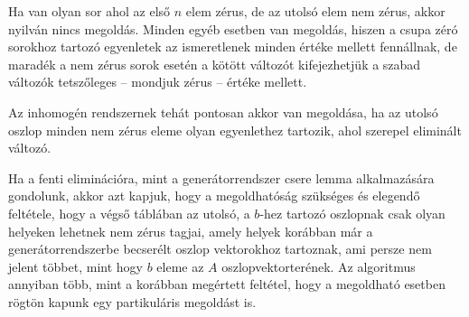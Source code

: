 \documentclass[9pt, showtrims]{memoir}
\theoremstyle{plain}
\theoremstyle{remark}
\theoremstyle{definition}
\begin{document}
Ha van olyan sor ahol az első $n$ elem zérus, de az utolsó elem nem zérus, 
akkor nyilván nincs megoldás.
Minden egyéb esetben van megoldás, 
hiszen a csupa zéró sorokhoz tartozó egyenletek az ismeretlenek minden értéke mellett fennállnak,
de maradék a nem zérus sorok esetén a kötött változót
kifejezhetjük a szabad változók tetszőleges -- mondjuk zérus -- értéke mellett.

Az inhomogén rendszernek tehát pontosan akkor van megoldása, 
ha az utolsó oszlop minden nem zérus eleme olyan egyenlethez tartozik, 
ahol szerepel eliminált változó.

Ha a fenti eliminációra, mint a generátorrendszer csere lemma alkalmazására gondolunk,
akkor azt kapjuk, hogy a megoldhatóság szükséges és elegendő feltétele,
hogy a végső táblában az utolsó, a $b$-hez tartozó oszlopnak csak olyan helyeken lehetnek nem zérus tagjai,
amely helyek korábban már a generátorrendszerbe becserélt oszlop vektorokhoz tartoznak,
ami persze nem jelent többet, mint hogy $b$ eleme az $A$ oszlopvektorterének.
Az algoritmus annyiban több, mint a korábban megértett feltétel, 
hogy a megoldható esetben rögtön kapunk egy partikuláris megoldást is.
\end{document}
